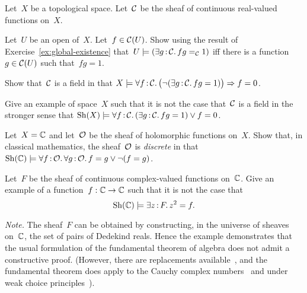 \documentclass{ws-rv9x6}
\begin{document}
{\begin{exercise}%
Let~$X$ be a topological space. Let~$\mathcal{C}$ be the sheaf of continuous real-valued
functions on~$X$.
\begin{alphlist}[(d)]
\item Let~$U$ be an open of~$X$. Let~$f \in \mathcal{C}(U)$. Show using the result
of Exercise~\ref{ex:global-existence} that~$U \models (\exists g\,{:}\,\mathcal{C}\mathpunct{.} fg =_{\mathcal{C}}
1)$ iff there is a function~$g \in \mathcal{C}(U)$ such that~$fg = 1$.
\item Show that~$\mathcal{C}$ is a field in that
$X \models \forall f\,{:}\,\mathcal{C}\mathpunct{.}
  \bigl(\neg(\exists g\,{:}\,\mathcal{C}\mathpunct{.} fg = 1)\bigr) \Rightarrow f = 0$.
\item Give an example of space~$X$ such that it is not the case that~$\mathcal{C}$ is a
field in the stronger sense that
$\mathrm{Sh}(X) \models \forall f\,{:}\,\mathcal{C}\mathpunct{.} (\exists g\,{:}\,\mathcal{C}\mathpunct{.} fg = 1) \vee f = 0$.
\item Let~$X = \mathbb{C}$ and let~$\mathcal{O}$ be the sheaf of holomorphic functions on~$X$.
Show that, in classical mathematics, the sheaf~$\mathcal{O}$ is \emph{discrete} in that
$\mathrm{Sh}(\mathbb{C}) \models \forall f\,{:}\,\mathcal{O}\mathpunct{.} \forall g\,{:}\,\mathcal{O}\mathpunct{.} f = g \vee \neg(f = g)$.
\end{alphlist}
\end{exercise}

\begin{exercise}%
\label{ex:fta}%
Let~$F$ be the sheaf of continuous complex-valued functions on~$\mathbb{C}$. Give an
example of a function~$f : \mathbb{C} \to \mathbb{C}$ such that it is not the case that
\[ \mathrm{Sh}(\mathbb{C}) \models \exists z\,{:}\,F\mathpunct{.} z^2 = f. \]
{\scriptsize\emph{Note.} The sheaf~$F$ can be obtained by constructing, in the
universe of sheaves on~$\mathbb{C}$, the set of pairs of Dedekind reals. Hence the
example demonstrates that the usual formulation of the fundamental theorem of
algebra does not admit a constructive proof. (However, there are replacements
available~\cite{richman:fta}, and the fundamental theorem does apply to the
Cauchy complex numbers~\cite{ruitenburg:roots} and under weak choice
principles~\cite{bridges-richman-schuster:wcc}).\par}
\end{exercise}

}
\end{document}
